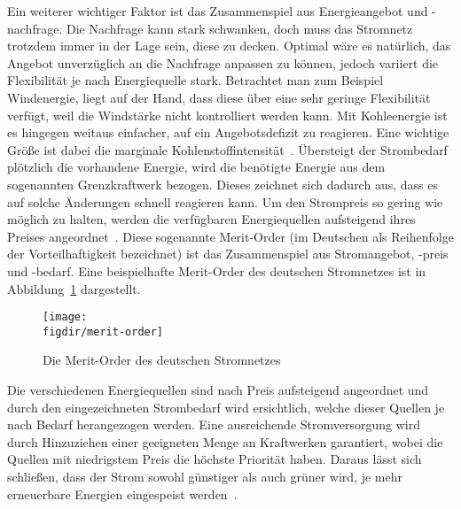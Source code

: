 Ein weiterer wichtiger Faktor ist das Zusammenspiel aus Energieangebot und -nachfrage.
Die Nachfrage kann stark schwanken, doch muss das Stromnetz trotzdem immer in der Lage sein, diese zu decken.
Optimal wäre es natürlich, das Angebot unverzüglich an die Nachfrage anpassen zu können, jedoch variiert die Flexibilität je nach Energiequelle stark.
Betrachtet man zum Beispiel Windenergie, liegt auf der Hand, dass diese über eine sehr geringe Flexibilität verfügt, weil die Windstärke nicht kontrolliert werden kann.
Mit Kohleenergie ist es hingegen weitaus einfacher, auf ein Angebotsdefizit zu reagieren.
Eine wichtige Größe ist dabei die marginale Kohlenstoffintensität~\cite{GreenSoftwareFoundation.2022}.
Übersteigt der Strombedarf plötzlich die vorhandene Energie, wird die benötigte Energie aus dem sogenannten Grenzkraftwerk bezogen.
Dieses zeichnet sich dadurch aus, dass es auf solche Änderungen schnell reagieren kann.
Um den Strompreis so gering wie möglich zu halten, werden die verfügbaren Energiequellen aufsteigend ihres Preises angeordnet~\cite{Corradi.20231207T10:48:51.000Z}.
Diese sogenannte Merit-Order (im Deutschen als Reihenfolge der Vorteilhaftigkeit bezeichnet) ist das Zusammenspiel aus Stromangebot, -preis und -bedarf.
Eine beispielhafte Merit-Order des deutschen Stromnetzes ist in Abbildung~\ref{FIG:merit-order} dargestellt.
\begin{figure}
 \caption{Die Merit-Order des deutschen Stromnetzes~\cite{Gro.5.10.2022}}
 {\texttt{[image: \\figdir/merit-order]}}
 \label{FIG:merit-order}
\end{figure}
Die verschiedenen Energiequellen sind nach Preis aufsteigend angeordnet und durch den eingezeichneten Strombedarf wird ersichtlich, welche dieser Quellen je nach Bedarf herangezogen werden.
Eine ausreichende Stromversorgung wird durch Hinzuziehen einer geeigneten Menge an Kraftwerken garantiert, wobei die Quellen mit niedrigstem Preis die höchste Priorität haben.
Daraus lässt sich schließen, dass der Strom sowohl günstiger als auch grüner wird, je mehr erneuerbare Energien eingespeist werden~\cite{Gro.5.10.2022}.

